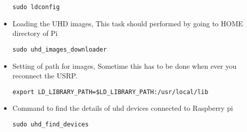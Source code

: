 \documentclass[journal,12pt,twocolumn]{IEEEtran}
\begin{document}
\begin{itemize}
\begin{lstlisting}[frame=single]
sudo ldconfig
\end{lstlisting}
%
\item Loading the UHD images, This task should performed by going to HOME directory of Pi 
\begin{lstlisting}[frame=single]
sudo uhd_images_downloader
\end{lstlisting}
%
\item Setting of path for images, Sometime this has to be done when ever you reconnect the USRP.
\begin{lstlisting}[frame=single]
export LD_LIBRARY_PATH=$LD_LIBRARY_PATH:/usr/local/lib
\end{lstlisting}
%
\item Command to find the details of uhd devices connected to Raspberry pi
\begin{lstlisting}[frame=single]
sudo uhd_find_devices
\end{lstlisting}
%
\end{itemize}
%



\end{document}
